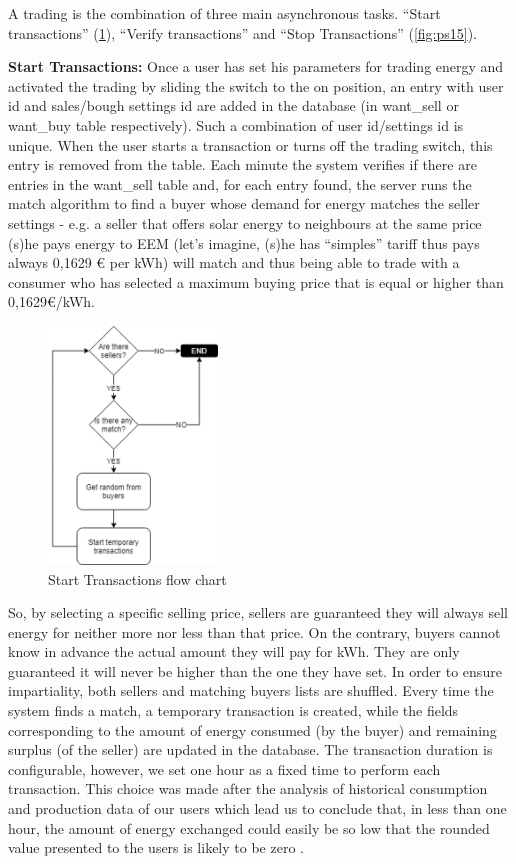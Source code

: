 A trading is the combination of three main asynchronous tasks. “Start transactions” (\cref{fig:ps13}), “Verify transactions” and “Stop Transactions” (\cref{fig:ps15}).

\textbf{Start Transactions:} Once a user has set his parameters for trading energy and activated the trading by sliding the switch to the on position, an entry with user id and sales/bough settings id are added in the database (in want\_sell or want\_buy table respectively). Such a combination of user id/settings id is unique. When the user starts a transaction or turns off the trading switch, this entry is removed from the table. Each minute the system verifies if there are entries in the want\_sell table and, for each entry found, the server runs the match algorithm to find a buyer whose demand for energy matches the seller settings - e.g. a seller that offers solar energy to neighbours at the same price (s)he pays energy to EEM (let’s imagine, (s)he has “simples” tariff thus pays always 0,1629 € per kWh) will match and thus being able to trade with a consumer who has selected a maximum buying price that is equal or higher than 0,1629€/kWh. 

\begin{figure}[h]
\centering
\includegraphics[width=0.4\textwidth]{./Images/ps13}
\caption{Start Transactions flow chart}
\label{fig:ps13}
\end{figure}

So, by selecting a specific selling price, sellers are guaranteed they will always sell energy for neither more nor less than that price. On the contrary, buyers cannot know in advance the actual amount they will pay for kWh. They are only guaranteed it will never be higher than the one they have set. In order to ensure impartiality, both sellers and matching buyers lists are shuffled. Every time the system finds a match, a temporary transaction is created, while the fields corresponding to the amount of energy consumed (by the buyer)  and remaining surplus (of the seller) are updated in the database. The transaction duration is configurable, however, we set one hour as a fixed time to perform each transaction. This choice was made after the analysis of historical consumption and production data of our users which lead us to conclude that, in less than one hour, the amount of energy exchanged could easily be so low  that the rounded value presented to the users is likely to be zero . 





